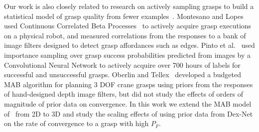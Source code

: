 Our work is also closely related to research on actively sampling grasps to build a statistical model of grasp quality from fewer examples~\cite{detry2011learning, kroemer2010combining, salganicoff1996active}.
Montesano and Lopes~\cite{montesano2012active} used Continuous Correlated Beta Processes~\cite{goetschalckx2011continuous} to actively acquire grasp executions on a physical robot, and measured correlations from the responses to a bank of image filters designed to detect grasp affordances such as edges.
Pinto et al.~\cite{pinto2016supersizing} used importance sampling over grasp success probabilities predicted from images by a Convolutional Neural Network to actively acquire over 700 hours of labels for successful and unsuccessful grasps.
Oberlin and Tellex~\cite{oberlin2015autonomously} developed a budgeted MAB algorithm for planning 3 DOF crane grasps using priors from the responses of hand-designed depth image filters, but did not study the effects of orders of magnitude of prior data on convergence.
In this work we extend the MAB model of~\cite{laskey2015bandits} from 2D to 3D and study the scaling effects of using prior data from Dex-Net on the rate of convergence to a grasp with high $P_F$.

